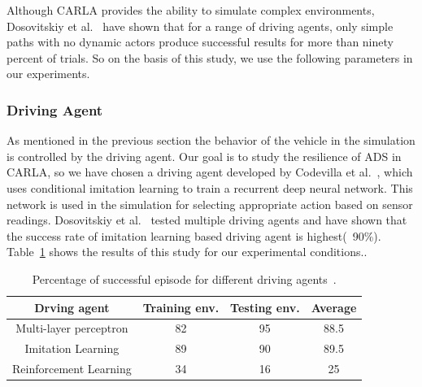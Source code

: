  
Although CARLA provides the ability to simulate complex environments, Dosovitskiy et al.~\cite{Dosovitskiy17} have shown that for a range of driving agents, only simple paths with no dynamic actors produce successful results for more than ninety percent of trials. So on the basis of this study, we use the following parameters in our experiments.
 
 \subsubsection{Driving Agent}
 As mentioned in the previous section the behavior of the vehicle in the simulation is controlled by the driving agent. Our goal is to study the resilience of ADS in CARLA, so we have chosen a driving agent developed by Codevilla et al.~\cite{Codevilla2018}, which uses conditional imitation learning to train a recurrent deep neural network. This network is used in the simulation for selecting appropriate action based on sensor readings. Dosovitskiy et al.~\cite{Dosovitskiy17} tested multiple driving agents and have shown that the success rate of imitation learning based driving agent is highest(~90\%). Table~\ref{table:1} shows the results of this study for our experimental conditions..
 
\begin{table}
	\vspace{1.0em}
	\begin{tabular}{| c | c | c | c |}
		\hline
		Drving agent & Training env. & Testing env. & Average  \\
		\hline
		Multi-layer perceptron & 82 & 95 & 88.5  \\ 
 		Imitation Learning & 89 & 90 & 89.5 \\  
 		Reinforcement Learning  & 34 & 16 & 25 \\
 		\hline
 	\end{tabular}
 \caption{Percentage of successful episode for different driving agents~\cite{Dosovitskiy17}.}
 \label{table:1}
 \vspace{-2.0em}
\end{table}

